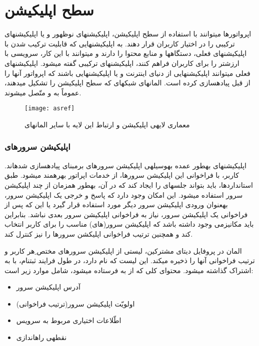 \section{سطح اپلیکیشن}
اپرواتورها می\nf توانند با استفاده از سطح اپلیکیشن، اپلیکیشن\nf های نوظهور و یا اپلیکیشن\nf های ترکیبی را در اختیار کاربران قرار دهند. به اپلیکیشن\nf هایی که قابلیت ترکیب شدن با اپلیکیشن\nf های فعلی، دستگاه\nf ها و منابع محتوا را دارند و می\nf توانند با این کار، سرویسی با ارزش\nf تر را برای کاربران فراهم کنند، اپلیکیشن\nf های ترکیبی گفته می\nf شود. اپلیکیشن\nf های فعلی می\nf توانند اپلیکیشن\nf هایی از دنیای اینترنت و یا اپلیکیشن\nf هایی باشند که اپرواتور آن\nf ها را از قبل پیاده\nf سازی کرده است. المان\nf های شبکه\nf ای که سطح اپلیکیشن را تشکیل می\nf دهند، عموماً به  و  متّصل می\nf شوند. 
\begin{figure}[h]
\centering
\texttt{[image: asref]}
\caption{معماری لایه\nf ی اپلیکیشن و ارتباط این لایه با سایر المان\nf های }
\label{asref}
\end{figure}
\subsubsection{اپلیکیشن سرورهای }

اپلیکیشن\nf های  به\nf طور عمده به\nf وسیله\nf ی اپلیکیشن سرورهای برمبنای  پیاده\nf سازی شده\nf اند. کاربر، با فراخوانی این اپلیکیشن سرورها، از خدمات اپراتور بهره\nf مند می\nf شود. طبق استانداردها،  باید بتواند جلسه\nf ای را ایجاد کند که در آن، به\nf طور هم\nf زمان از چند اپلیکیشن سرور استفاده می\nf شود. این امکان وجود دارد که پاسخ و خرجی یک اپلیکیشن سرور، به\nf عنوان ورودی اپلیکیشن سرور دیگر مورد استفاده قرار گیرد یا این که پس از فراخوانی یک اپلیکیشن سرور، نیاز به فراخوانی اپلیکیشن سرور بعدی نباشد. بنابراین باید مکانیزمی وجود داشته باشد که اپلیکیشن سرور(های) مناسب را برای کاربر انتخاب کند و همچنین ترتیب فراخوانی اپلیکشن سرورها را نیز کنترل کند.

المان  در پروفایل دیتای مشترکین، لیستی از اپلیکیشن سرورهای مختص ِهر کاربر و ترتیب فراخوانی آن\nf ها را ذخیره می\nf کند. این لیست که  نام دارد، در طول فرایند ثبت\nf نام، با  به اشتراک گذاشته می\nf شود. محتوای کلی  که از  به  فرستاده می\nf شود، شامل موارد زیر است:


\begin{itemize}
\item آدرس اپلیکیشن سرور
\item اولویّت اپلیکیشن سرور(ترتیب فراخوانی)
\item اطّلاعات اختیاری مربوط به سرویس
\item نقطه\nf ی راه\nf اندازی
\end{itemize}


